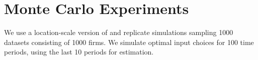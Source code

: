 \documentclass[11pt]{article}
\begin{document}


\section{Monte Carlo Experiments} \label{montecarlo}
We use a location-scale version of \cite{Levinsohn2003} and replicate \cite{Ackerberg2015} simulations sampling 1000 datasets consisting of 1000 firms. We simulate optimal input choices for 100 time periods, using the last 10 periods for estimation. 
\end{document}
